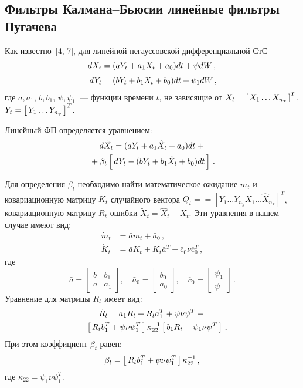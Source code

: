 \begin{multicols}{2}
\section{Фильтры Калмана--Бьюси\newline и линейные
фильтры Пугачева}

 Как известно~[4, 7], для линейной негауссовской
дифференциальной СтС
\begin{align}
    dX_t &=( aY_t +a_{1}X_t+a_{0}) dt+ \psi dW\,,\notag\\[-6pt]
&\\[-6pt]
    dY_t &=( bY_t +b_{1}X_t+b_{0}) dt+ \psi_1 dW\,,\notag
\end{align}
где  $a,a_{1}$, $b, b_1$, $\psi, \psi_1$~--- функции  времени $t$, не
зависящие от $X_t =\left[\, X_1\ldots X_{n_x}\,\right]^T$,  $Y_t=\left[\,
Y_1\ldots Y_{n_y}\,\right]^T$.

Линейный ФП определяется уравнением:
\begin{multline*}
d\hat X_t =(a Y_t +a_{1}\hat X_t + a_{0}) dt +{}\\
{}+\beta_t \left[\, dY_t - (b Y_t + b_{1}\hat X_t+ b_{0}) dt\,\right]\,.
\end{multline*}

Для определения  $\beta_t$ необходимо найти математическое
ожидание $m_t$ и ковариационную матрицу  $K_t$ случайного вектора
$Q_t=$\linebreak $=[ Y_1\ldots Y_{n_y} X_1\ldots \hat X_{n_x}]^T$,
ковариационную матрицу $R_t$ ошибки  $\tilde X _t=\hat X_t
-X_t$. Эти уравнения в нашем случае имеют вид:
\begin{align*}
\dot m_t &= \bar a m_t+\bar a_0\,,\\
    \dot K_t &= \bar a K_t + K_t\bar a^T + \bar c_0\nu \overline{c}_0^{T}\,,
\end{align*}
где\\[-12pt]
\begin{equation*}
\bar a=\begin{bmatrix}
b&b_{1}\\
a&a_{1}
\end{bmatrix},\quad
\bar a_0=
    \begin{bmatrix}
b_{0} \\
a_{0}
\end{bmatrix},\quad
\overline{c}_0=
\begin{bmatrix}
\psi_1\\
\psi
\end{bmatrix}\,.
\end{equation*}
Уравнение для матрицы  $R_t$ имеет вид:
\begin{multline*}
\dot R_t = a_{1} R_t + R_t a_{1}^T +\psi\nu\psi^T-{}\\
{}-\left[\, R_t b_{1}^T+ \psi \nu
    \psi_1^T\,\right] \kappa_{22}^{-1} \left[\,
    b_{1}R_t + \psi_1 \nu \psi^T \,\right]\,,
\end{multline*}
При этом коэффициент  $\beta_t$ равен:
\begin{equation*}
\beta_t =\left[\, R_t b_1^T +\psi \nu\psi_1^T\,\right] \kappa_{22}^{-1}\,,
\end{equation*}
где $\kappa_{22} = \psi_1\nu\psi_1^T$.


\end{multicols}
